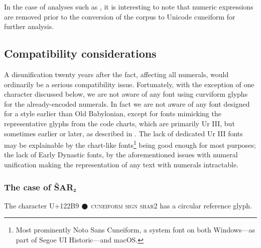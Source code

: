 \documentclass[10pt, a4paper, twoside]{article}
\newcommand{\textcsc}[1]{{\addfontfeature{Letters=UppercaseSmallCaps}#1}}
\begin{document}
In the case of analyses such as
\cite[\emph{sub} ``\href{https://github.com/ARomach/Cuneiform-Stylometry/tree/06278f9f9747a897d00fb0418b6eaa14fa573e83\#adding-corpora}{Adding Corpora}'']{Romach2023},
it is interesting to note that numeric expressions are removed prior
to the conversion of the corpus to Unicode cuneiform for further analysis.

\subsection{Compatibility considerations}
\label{compatibility}
A disunification twenty years after the fact,
affecting all numerals, would ordinarily be a serious
compatibility issue.
Fortunately, with the exception of one character discussed below,
we are not aware of any font using curviform glyphs for the
already-encoded numerals.
In fact we are not aware of any font designed for a style earlier than Old Babylonian,
except for fonts mimicking the representative glyphs from the code charts,
which are primarily Ur III, but sometimes earlier or later,
as described in \cite[\href{https://www.unicode.org/reports/tr56/\#Representative_Glyphs}{§2.4}]{UTR56}.
The lack of dedicated Ur III fonts may be explainable by the chart-like fonts\footnote{Most
prominently Noto Sans Cuneiform, a system font on both Windows—as part of Segoe UI Historic—and macOS.}
being good enough for most purposes;
the lack of Early Dynastic fonts, by the aforementioned issues with numeral unification
making the representation of any text with numerals intractable.

\subsubsection{The case of ŠAR₂}\label{šar₂}
The character U+\textcsc{122B9} {\cuneiformComposite 𒊹} \textsc{cuneiform sign shar2}
has a circular reference glyph.
\end{document}
